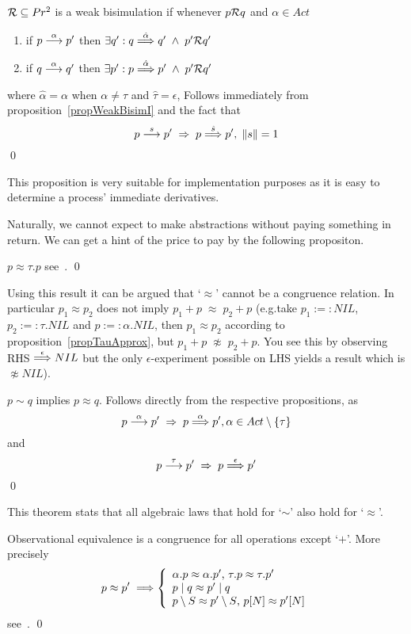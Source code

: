 \begin{proposition}\label{propWeakBisim}
${\cal R}\subseteq Pr^2$ is a weak bisimulation if whenever $p{\cal R}q$ and $\alpha\in Act$
\begin{enumerate}
\item if $p\stackrel{\alpha}{\longrightarrow}p'$ then $\exists q':q\stackrel{\hat{\alpha}}{\Longrightarrow}q'\;\wedge\; p'{\cal R}q'$
\item if $q\stackrel{\alpha}{\longrightarrow}q'$ then $\exists p':p\stackrel{\hat{\alpha}}{\Longrightarrow}p'\;\wedge\; p'{\cal R}q'$
\end{enumerate}
where $\hat{\alpha} = \alpha$ when $\alpha\not=\tau$ and $\hat{\tau} = \epsilon$,
\proof Follows immediately from proposition~\ref{propWeakBisimI} and the fact that
\[
p\stackrel{s}{\longrightarrow}p'\;\Rightarrow\;p\stackrel{\hat{s}}{\Longrightarrow}p',\; \|s\|=1
\]
\qed
\end{proposition}

\noindent
This proposition is very suitable for implementation purposes as it is easy to determine a process' immediate derivatives.

\noindent
Naturally, we cannot expect to make abstractions without paying something in return. We can get a hint of the price to pay by the following propositon.

\begin{proposition}\label{propTauApprox}
$p\approx\tau.p$
\proof see~\cite{Milner}.
\qed
\end{proposition}

\noindent
Using this result it can be argued that `$\approx$' cannot be a congruence relation. In particular $p_1\approx p_2$ does not imply $p_1+p\;\approx\;p_2+p$ (e.g.\@ take $p_1 :=: NIL$, $p_2 :=:  \tau.NIL$ and $p:=: \alpha.NIL$, then $p_1\approx p_2$ according to proposition~\ref{propTauApprox}, but $p_1+p\;\not\approx\; p_2+p$. You see this by observing RHS $\stackrel{\epsilon}{\Longrightarrow} NIL$ but the only $\epsilon$-experiment possible on LHS yields a result which is $\not\approx NIL$).

\begin{theorem}\label{theoSimImplyApprox}
$p\sim q$ implies $p\approx q$.
\proof Follows directly from the respective propositions, as
\[
p\stackrel{\alpha}{\longrightarrow}p'\;\Rightarrow\;p\stackrel{\alpha}{\Longrightarrow}p', \alpha\in Act\setminus \{\tau\}
\]
and
\[
p\stackrel{\tau}{\longrightarrow}p'\;\Rightarrow\;p\stackrel{\epsilon}{\Longrightarrow}p'
\]
\qed
\end{theorem}

\noindent
This theorem stats that all algebraic laws that hold for `$\sim$' also hold for `$\approx$'.

\begin{theorem}\label{theoObderCongruence}
Observational equivalence is a congruence for all operations except `$+$'. More precisely
\[
p\approx p'\;\Longrightarrow \left\{
\begin{array}{l}
\alpha.p\approx\alpha.p'\hbox{, }\tau.p\approx\tau.p'\\
p\mid q\approx p'\mid q\\
p\setminus S\approx p'\setminus S\hbox{, }p[N]\approx p'[N]
\end{array}
\right.
\]
\proof see~\cite{Milner}.
\qed
\end{theorem}

